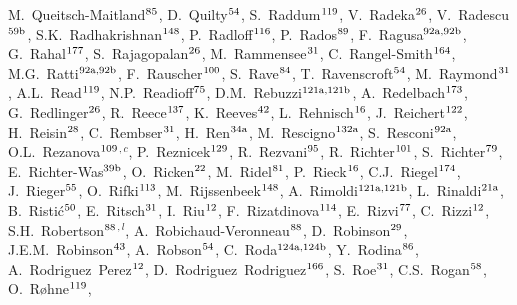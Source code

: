 \begin{flushleft}
M.~Queitsch-Maitland$^\textrm{\scriptsize 85}$,
D.~Quilty$^\textrm{\scriptsize 54}$,
S.~Raddum$^\textrm{\scriptsize 119}$,
V.~Radeka$^\textrm{\scriptsize 26}$,
V.~Radescu$^\textrm{\scriptsize 59b}$,
S.K.~Radhakrishnan$^\textrm{\scriptsize 148}$,
P.~Radloff$^\textrm{\scriptsize 116}$,
P.~Rados$^\textrm{\scriptsize 89}$,
F.~Ragusa$^\textrm{\scriptsize 92a,92b}$,
G.~Rahal$^\textrm{\scriptsize 177}$,
S.~Rajagopalan$^\textrm{\scriptsize 26}$,
M.~Rammensee$^\textrm{\scriptsize 31}$,
C.~Rangel-Smith$^\textrm{\scriptsize 164}$,
M.G.~Ratti$^\textrm{\scriptsize 92a,92b}$,
F.~Rauscher$^\textrm{\scriptsize 100}$,
S.~Rave$^\textrm{\scriptsize 84}$,
T.~Ravenscroft$^\textrm{\scriptsize 54}$,
M.~Raymond$^\textrm{\scriptsize 31}$,
A.L.~Read$^\textrm{\scriptsize 119}$,
N.P.~Readioff$^\textrm{\scriptsize 75}$,
D.M.~Rebuzzi$^\textrm{\scriptsize 121a,121b}$,
A.~Redelbach$^\textrm{\scriptsize 173}$,
G.~Redlinger$^\textrm{\scriptsize 26}$,
R.~Reece$^\textrm{\scriptsize 137}$,
K.~Reeves$^\textrm{\scriptsize 42}$,
L.~Rehnisch$^\textrm{\scriptsize 16}$,
J.~Reichert$^\textrm{\scriptsize 122}$,
H.~Reisin$^\textrm{\scriptsize 28}$,
C.~Rembser$^\textrm{\scriptsize 31}$,
H.~Ren$^\textrm{\scriptsize 34a}$,
M.~Rescigno$^\textrm{\scriptsize 132a}$,
S.~Resconi$^\textrm{\scriptsize 92a}$,
O.L.~Rezanova$^\textrm{\scriptsize 109}$$^{,c}$,
P.~Reznicek$^\textrm{\scriptsize 129}$,
R.~Rezvani$^\textrm{\scriptsize 95}$,
R.~Richter$^\textrm{\scriptsize 101}$,
S.~Richter$^\textrm{\scriptsize 79}$,
E.~Richter-Was$^\textrm{\scriptsize 39b}$,
O.~Ricken$^\textrm{\scriptsize 22}$,
M.~Ridel$^\textrm{\scriptsize 81}$,
P.~Rieck$^\textrm{\scriptsize 16}$,
C.J.~Riegel$^\textrm{\scriptsize 174}$,
J.~Rieger$^\textrm{\scriptsize 55}$,
O.~Rifki$^\textrm{\scriptsize 113}$,
M.~Rijssenbeek$^\textrm{\scriptsize 148}$,
A.~Rimoldi$^\textrm{\scriptsize 121a,121b}$,
L.~Rinaldi$^\textrm{\scriptsize 21a}$,
B.~Risti\'{c}$^\textrm{\scriptsize 50}$,
E.~Ritsch$^\textrm{\scriptsize 31}$,
I.~Riu$^\textrm{\scriptsize 12}$,
F.~Rizatdinova$^\textrm{\scriptsize 114}$,
E.~Rizvi$^\textrm{\scriptsize 77}$,
C.~Rizzi$^\textrm{\scriptsize 12}$,
S.H.~Robertson$^\textrm{\scriptsize 88}$$^{,l}$,
A.~Robichaud-Veronneau$^\textrm{\scriptsize 88}$,
D.~Robinson$^\textrm{\scriptsize 29}$,
J.E.M.~Robinson$^\textrm{\scriptsize 43}$,
A.~Robson$^\textrm{\scriptsize 54}$,
C.~Roda$^\textrm{\scriptsize 124a,124b}$,
Y.~Rodina$^\textrm{\scriptsize 86}$,
A.~Rodriguez~Perez$^\textrm{\scriptsize 12}$,
D.~Rodriguez~Rodriguez$^\textrm{\scriptsize 166}$,
S.~Roe$^\textrm{\scriptsize 31}$,
C.S.~Rogan$^\textrm{\scriptsize 58}$,
O.~R{\o}hne$^\textrm{\scriptsize 119}$,

\end{flushleft}
